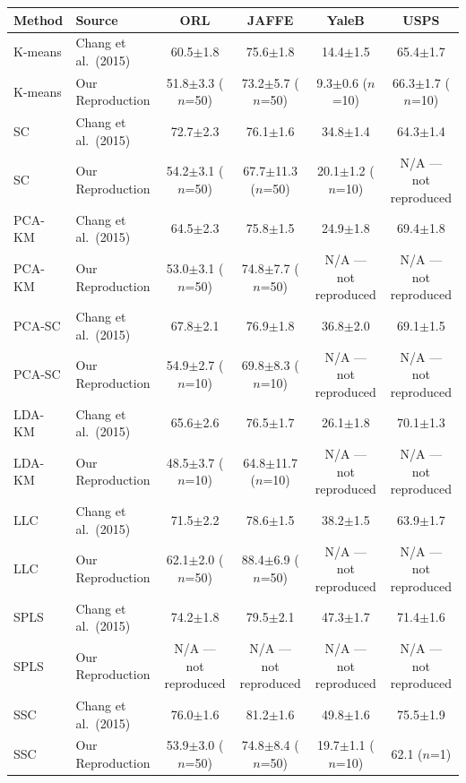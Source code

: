 \begin{tabular}{llcccc}
\toprule
Method & Source & ORL & JAFFE & YaleB & USPS \\
\midrule
K-means & Chang et al.\ (2015) & 60.5$\pm$1.8 & 75.6$\pm$1.8 & 14.4$\pm$1.5 & 65.4$\pm$1.7 \\
K-means & Our Reproduction & 51.8$\pm$3.3 ($n$=50) & 73.2$\pm$5.7 ($n$=50) & 9.3$\pm$0.6 ($n$=10) & 66.3$\pm$1.7 ($n$=10) \\
SC & Chang et al.\ (2015) & 72.7$\pm$2.3 & 76.1$\pm$1.6 & 34.8$\pm$1.4 & 64.3$\pm$1.4 \\
SC & Our Reproduction & 54.2$\pm$3.1 ($n$=50) & 67.7$\pm$11.3 ($n$=50) & 20.1$\pm$1.2 ($n$=10) & N/A --- not reproduced \\
PCA-KM & Chang et al.\ (2015) & 64.5$\pm$2.3 & 75.8$\pm$1.5 & 24.9$\pm$1.8 & 69.4$\pm$1.8 \\
PCA-KM & Our Reproduction & 53.0$\pm$3.1 ($n$=50) & 74.8$\pm$7.7 ($n$=50) & N/A --- not reproduced & N/A --- not reproduced \\
PCA-SC & Chang et al.\ (2015) & 67.8$\pm$2.1 & 76.9$\pm$1.8 & 36.8$\pm$2.0 & 69.1$\pm$1.5 \\
PCA-SC & Our Reproduction & 54.9$\pm$2.7 ($n$=10) & 69.8$\pm$8.3 ($n$=10) & N/A --- not reproduced & N/A --- not reproduced \\
LDA-KM & Chang et al.\ (2015) & 65.6$\pm$2.6 & 76.5$\pm$1.7 & 26.1$\pm$1.8 & 70.1$\pm$1.3 \\
LDA-KM & Our Reproduction & 48.5$\pm$3.7 ($n$=10) & 64.8$\pm$11.7 ($n$=10) & N/A --- not reproduced & N/A --- not reproduced \\
LLC & Chang et al.\ (2015) & 71.5$\pm$2.2 & 78.6$\pm$1.5 & 38.2$\pm$1.5 & 63.9$\pm$1.7 \\
LLC & Our Reproduction & 62.1$\pm$2.0 ($n$=50) & 88.4$\pm$6.9 ($n$=50) & N/A --- not reproduced & N/A --- not reproduced \\
SPLS & Chang et al.\ (2015) & 74.2$\pm$1.8 & 79.5$\pm$2.1 & 47.3$\pm$1.7 & 71.4$\pm$1.6 \\
SPLS & Our Reproduction & N/A --- not reproduced & N/A --- not reproduced & N/A --- not reproduced & N/A --- not reproduced \\
SSC & Chang et al.\ (2015) & 76.0$\pm$1.6 & 81.2$\pm$1.6 & 49.8$\pm$1.6 & 75.5$\pm$1.9 \\
SSC & Our Reproduction & 53.9$\pm$3.0 ($n$=50) & 74.8$\pm$8.4 ($n$=50) & 19.7$\pm$1.1 ($n$=10) & 62.1 ($n$=1) \\
\bottomrule
\end{tabular}
